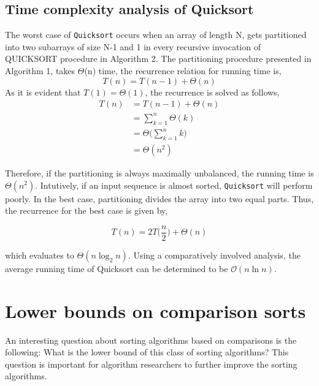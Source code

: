 \documentclass[a4paper, 10pt,twocolumn]{article}
\begin{document}
\subsection{Time complexity analysis of Quicksort}
The worst case of \texttt{Quicksort} occurs when an array of length N, gets partitioned into two subarrays of size N-1 and 1 in every recursive invocation of QUICKSORT procedure in Algorithm 2. The partitioning procedure presented in Algorithm 1, takes $\Theta$(n) time, the recurrence relation for running time is,
\begin{equation*}
    T(n) = T(n-1) + \Theta(n)
\end{equation*}
As it is evident that $T(1) = \Theta(1)$, the recurrence is solved as follows,
\begin{equation*}
\begin{split}
    T(n) &= T(n-1) + \Theta(n)\\
         &= \sum\limits_{k=1}^n\Theta(k)\\
         &= \Theta\bigg(\sum\limits_{k=1}^n k\bigg)\\
         &= \Theta(n^2)
\end{split}
\end{equation*}

Therefore, if the partitioning is always maximally unbalanced, the running time is $\Theta(n^2)$. Intutively, if an input sequence is almost sorted, \texttt{Quicksort} will perform poorly. In the best case, partitioning divides the array into two equal parts. Thus, the recurrence for the best case is given by,

\begin{equation*}
    T(n)=2T\bigg(\frac{n}{2}\bigg) + \Theta(n)
\end{equation*}

which evaluates to $\Theta(n\log_{2}n)$. Using a comparatively
involved analysis, the average running time
of Quicksort can be determined to be $\mathcal{O}(n\ln{n})$.

\section{Lower bounds on comparison sorts}
An interesting question about sorting algorithms based on comparisons is the following: What is the lower bound of this class of sorting algorithms? This question is important for algorithm researchers to further improve the sorting algorithms.
\end{document}
